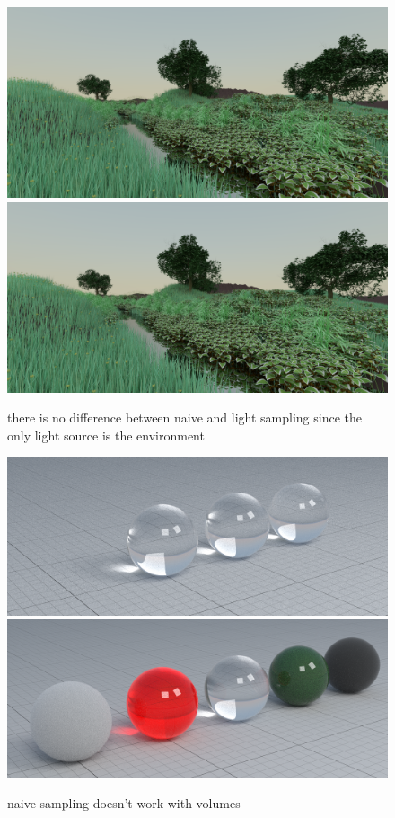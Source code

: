 \documentclass[12pt]{report}
\begin{document}
    \begin{figure}[h]
        \caption{there is no difference between naive and light sampling since the only light source is the environment}
        \includegraphics[width=\textwidth]{ecosys_naive}
        \includegraphics[width=\textwidth]{ecosys_path}
        \centering
        \label{fig:ecosys}
    \end{figure}

    \begin{figure}[h]
        \caption{naive sampling doesn't work with volumes}
        \includegraphics[width=\textwidth]{materials4_naive}
        \includegraphics[width=\textwidth]{materials4_path}
        \centering
        \label{fig:materials4}
    \end{figure}
\end{document}
